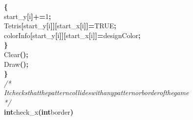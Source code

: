 \documentclass[a4paper, 10pt]{article}
\newcommand\SPC{\hspace*{0.6em}}
\newcommand\HYP{\mbox{\char 45}}
\newcommand{\CppAComment}[1]{\textit{\textcolor[rgb]{0.2,0.6,1}{#1}}}
\newcommand{\CppAIdentifier}[1]{#1}
\newcommand{\CppANumber}[1]{\textcolor[rgb]{0.5,0,0.5}{#1}}
\newcommand{\CppAReservedWord}[1]{\textbf{#1}}
\newcommand{\CppASpace}[1]{\colorbox[rgb]{1,1,1}{#1}}
\newcommand{\CppASymbol}[1]{\textbf{\textcolor[rgb]{1,0,0}{#1}}}
\begin{document}
\begin{ttfamily}
\CppASpace{\SPC }\CppASymbol{\{}\\
\CppASpace{\SPC \SPC }\CppAIdentifier{start\_y}\CppASymbol{[}\CppAIdentifier{i}\CppASymbol{]}\CppASymbol{+=}\CppANumber{1}\CppASymbol{;}\\
\CppASpace{\SPC \SPC }\CppAIdentifier{Tetris}\CppASymbol{[}\CppAIdentifier{start\_y}\CppASymbol{[}\CppAIdentifier{i}\CppASymbol{]}\CppASymbol{]}\CppASymbol{[}\CppAIdentifier{start\_x}\CppASymbol{[}\CppAIdentifier{i}\CppASymbol{]}\CppASymbol{]}\CppASymbol{=}\CppAIdentifier{TRUE}\CppASymbol{;}\\
\CppASpace{\SPC \SPC }\CppAIdentifier{colorInfo}\CppASymbol{[}\CppAIdentifier{start\_y}\CppASymbol{[}\CppAIdentifier{i}\CppASymbol{]}\CppASymbol{]}\CppASymbol{[}\CppAIdentifier{start\_x}\CppASymbol{[}\CppAIdentifier{i}\CppASymbol{]}\CppASymbol{]}\CppASymbol{=}\CppAIdentifier{designColor}\CppASymbol{;}\\
\CppASpace{\SPC }\CppASymbol{\}}\\
\CppASpace{\SPC }\CppAIdentifier{Clear}\CppASymbol{(}\CppASymbol{)}\CppASymbol{;}\\
\CppASpace{\SPC }\CppAIdentifier{Draw}\CppASymbol{(}\CppASymbol{)}\CppASymbol{;}\\
\CppASymbol{\}}\\
\CppAComment{/*\HYP \HYP \HYP \HYP \HYP \HYP \HYP \HYP \HYP \HYP \HYP \HYP \HYP \HYP \HYP \HYP \HYP \HYP \HYP \HYP \HYP \HYP \HYP \HYP \HYP \HYP \HYP \HYP \HYP \HYP \HYP \HYP \HYP \HYP \HYP \HYP \HYP \HYP \HYP \HYP \HYP \HYP \HYP \HYP \HYP \HYP \HYP \HYP \HYP \HYP \HYP \HYP \HYP \HYP \HYP \HYP \HYP \HYP \HYP \HYP \HYP \HYP \HYP \HYP \HYP \HYP \HYP \HYP \HYP \HYP \HYP \HYP \HYP \HYP \HYP \HYP \HYP \HYP \HYP }\\
\CppAComment{\SPC \SPC \SPC \SPC It\SPC checks\SPC that\SPC the\SPC pattern\SPC collides\SPC with\SPC any\SPC pattern\SPC or\SPC border\SPC of\SPC the\SPC game}\\
\CppAComment{\HYP \HYP \HYP \HYP \HYP \HYP \HYP \HYP \HYP \HYP \HYP \HYP \HYP \HYP \HYP \HYP \HYP \HYP \HYP \HYP \HYP \HYP \HYP \HYP \HYP \HYP \HYP \HYP \HYP \HYP \HYP \HYP \HYP \HYP \HYP \HYP \HYP \HYP \HYP \HYP \HYP \HYP \HYP \HYP \HYP \HYP \HYP \HYP \HYP \HYP \HYP \HYP \HYP \HYP \HYP \HYP \HYP \HYP \HYP \HYP \HYP \HYP \HYP \HYP \HYP \HYP \HYP \HYP \HYP \HYP \HYP \HYP \HYP \HYP \HYP \HYP \HYP \HYP \HYP \HYP \HYP */}\\
\CppAReservedWord{int}\CppASpace{\SPC }\CppAIdentifier{check\_x}\CppASymbol{(}\CppAReservedWord{int}\CppASpace{\SPC }\CppAIdentifier{border}\CppASymbol{)}\\

\end{ttfamily}
\end{document}
